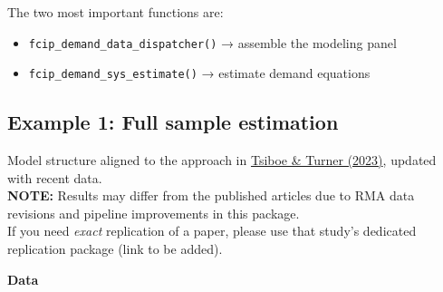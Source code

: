 \documentclass[
]{article}
\providecommand{\tightlist}{%
  \setlength{\itemsep}{0pt}\setlength{\parskip}{0pt}}
\begin{document}
The two most important functions are:

\begin{itemize}
\tightlist
\item
  \texttt{fcip\_demand\_data\_dispatcher()} → assemble the modeling
  panel\\
\item
  \texttt{fcip\_demand\_sys\_estimate()} → estimate demand equations
\end{itemize}

\subsection{Example 1: Full sample
estimation}\label{example-1-full-sample-estimation}

Model structure aligned to the approach in
\href{https://doi.org/10.1016/j.foodpol.2023.102505}{Tsiboe \& Turner
(2023)}, updated with recent data.\\
\textbf{NOTE:} Results may differ from the published articles due to RMA
data revisions and pipeline improvements in this package.\\
If you need \emph{exact} replication of a paper, please use that study's
dedicated replication package (link to be added).

\textbf{Data}
\end{document}
